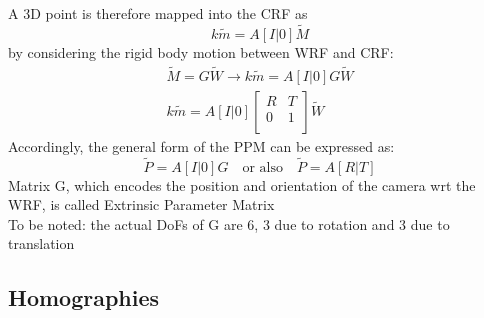 \documentclass{article}
\begin{document}
A 3D point is therefore mapped into the CRF as
\begin{equation}
    k\tilde{m}=A[I|0]\tilde{M}
\end{equation}
by considering the rigid body motion between WRF and CRF:
\begin{gather}
    \tilde{M} = G \tilde{W} \rightarrow k\tilde{m}=A[I|0]G\tilde{W}\\
    k\tilde{m}=A[I|0]\begin{bmatrix}
        R & T \\
        0 & 1 \\
    \end{bmatrix} \tilde{W}
\end{gather}
Accordingly, the general form of the PPM can be expressed as:
\begin{equation}
    \tilde{P} = A[I|0]G \quad \text{or also} \quad \tilde{P}=A[R|T]
\end{equation}
Matrix G, which encodes the position and orientation of the camera wrt the WRF, is called Extrinsic Parameter Matrix\\
To be noted: the actual DoFs of G are 6, 3 due to rotation and 3 due to translation

\subsection{Homographies}
\end{document}
